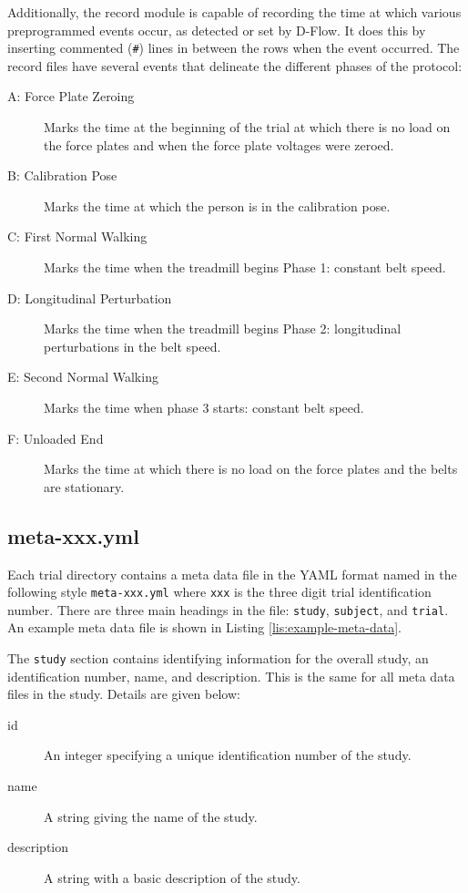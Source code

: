 \documentclass[fleqn,10pt]{wlpeerj}
\begin{document}
Additionally, the record module is capable of recording the time at which
various preprogrammed events occur, as detected or set by D-Flow. It does this
by inserting commented (\verb|#|) lines in between the rows when the event
occurred. The record files have several events that delineate the different
phases of the protocol:
%
\begin{description}
  \item[A: Force Plate Zeroing] Marks the time at the beginning of the trial at
    which there is no load on the force plates and when the force plate
    voltages were zeroed.
  \item[B: Calibration Pose] Marks the time at which the person is in the
    calibration pose.
  \item[C: First Normal Walking] Marks the time when the treadmill begins Phase
    1: constant belt speed.
  \item[D: Longitudinal Perturbation] Marks the time when the treadmill begins
    Phase 2: longitudinal perturbations in the belt speed.
  \item[E: Second Normal Walking] Marks the time when phase 3 starts: constant
    belt speed.
  \item[F: Unloaded End] Marks the time at which there is no load on the force
    plates and the belts are stationary.
\end{description}

\subsection*{meta-xxx.yml}

Each trial directory contains a meta data file in the YAML format named in the
following style \verb|meta-xxx.yml| where \verb|xxx| is the three digit trial
identification number. There are three main headings in the file: \verb+study+,
\verb+subject+, and \verb+trial+. An example meta data file is shown in Listing
\ref{lis:example-meta-data}.

The \verb+study+ section contains identifying information for the overall
study, an identification number, name, and description. This is the same for
all meta data files in the study. Details are given below:
%
\begin{description}
  \item[id] An integer specifying a unique identification number of the study.
  \item[name] A string giving the name of the study.
  \item[description] A string with a basic description of the study.
\end{description}
\end{document}
